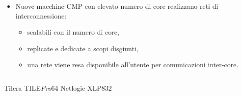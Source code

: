 \documentclass{beamer}
\newcommand{\tile}{TILE\textit{Pro}64}
\begin{document}
\begin{frame}
  \frametitle{}
  \begin{itemize}
  \item Nuove macchine CMP con elevato numero di core realizzano reti di interconnessione:
    \begin{itemize}
    \item scalabili con il numero di core,
    \item replicate e dedicate a scopi disgiunti,
    \item una rete viene resa disponibile all'utente per comunicazioni inter-core.
    \end{itemize}
  \end{itemize}
  \begin{columns}[c]
    {\small Tilera \tile}
    {\small Netlogic XLP832}
  \end{columns}
  \begin{columns}[c]

\end{columns}
\end{frame}
\end{document}
